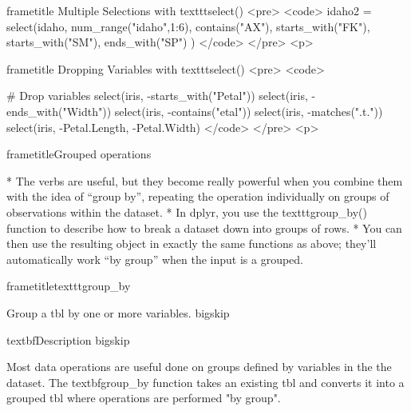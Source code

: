 				
				
					frametitle{ Multiple Selections with texttt{select()} }
					<pre>
						<code>
						idaho2 = select(idaho,
						num_range("idaho",1:6),
						contains("AX"),
						starts_with("FK"),
						starts_with("SM"),
						ends_with("SP") 
						)
						</code>
					</pre>
<p>
					
				
				
					frametitle{ Dropping Variables with texttt{select()} }
					<pre>
						<code>	
						
						# Drop variables
						select(iris, -starts_with("Petal"))
						select(iris, -ends_with("Width"))
						select(iris, -contains("etal"))
						select(iris, -matches(".t."))
						select(iris, -Petal.Length, -Petal.Width)
						</code>
					</pre>
<p>
					
				
				
	
		frametitle{Grouped operations}
		
			
			         * The verbs are useful, but they become really powerful when you combine them with the idea of “group by”, repeating the operation individually on groups of observations within the dataset. 
			         * In dplyr, you use the texttt{group_by()} function to describe how to break a dataset down into groups of rows. 
			         * You can then use the resulting object in exactly the same functions as above; they’ll automatically work “by group” when the input is a grouped.
		
	
	
	
		frametitle{texttt{group_by }}
		
		Group a tbl by one or more variables. bigskip
		
		textbf{Description} bigskip
		
		Most data operations are useful done on groups defined by variables in the the dataset. The
		textbf{group_by} function takes an existing tbl and converts it into a grouped tbl where operations are
		performed "by group".
		
	
	
